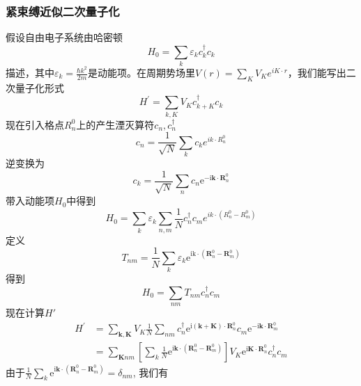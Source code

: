 \documentclass{article}
\numberwithin{equation}{subsection}
\begin{document}
\subsubsection*{紧束缚近似二次量子化}
假设自由电子系统由哈密顿
\begin{equation}
    H_{0}=\sum_{k} \varepsilon_{k} c_{k}^{\dagger} c_{k}
\end{equation}
描述，其中$\varepsilon_k=\frac{\hbar k^2}{2m}$是动能项。在周期势场里$V(r)=\sum_{K}V_{K}e^{iK\cdot r}$，我们能写出二次量子化形式
\begin{equation}
    H^{\prime}=\sum_{k, K} V_{K} c_{k+K}^{\dagger} c_{k}
\end{equation}
现在引入格点$R_n^0$上的产生湮灭算符$c_n,c_n^\dagger$
\begin{equation}
    c_n=\frac{1}{\sqrt{N}}\sum_{k}c_ke^{ik\cdot R_n^0}
\end{equation}
逆变换为
\begin{equation}
    c_{k}=\frac{1}{\sqrt{N}} \sum_{n} c_{n} \mathrm{e}^{-\mathrm{i} \mathbf{k} \cdot \mathbf{R}_{n}^{0}}
\end{equation}
带入动能项$H_0$中得到
\begin{equation}
    H_0=\sum_{k}\varepsilon_k\sum_{n,m}\frac{1}{N}c_n^\dagger c_m e^{ik\cdot(R_n^0-R_m^0)}
\end{equation}
定义
\begin{equation}
    T_{n m}=\frac{1}{N} \sum_{k} \varepsilon_{k} \mathrm{e}^{\mathrm{ik} \cdot\left(\mathbf{R}_{n}^{0}-\mathbf{R}_{m}^{0}\right)}
\end{equation}
得到
\begin{equation}
    H_{0}=\sum_{n m} T_{n m} c_{n}^{\dagger} c_{m}
\end{equation}
现在计算$H'$
\begin{equation}
    \begin{aligned}
        H^{\prime} &=\sum_{\mathbf{k}, \mathbf{K}} V_{K} \frac{1}{N} \sum_{n m} c_{n}^{\dagger} \mathrm{e}^{\mathrm{i}(\mathbf{k}+\mathbf{K}) \cdot \mathbf{R}_{n}^{0}} c_{m} \mathrm{e}^{-\mathrm{i} \mathbf{k} \cdot \mathbf{R}_{m}^{0}} \\
        &=\sum_{\mathbf{K} n m}\left[\sum_{k} \frac{1}{N} \mathrm{e}^{\mathrm{i} \mathbf{k} \cdot\left(\mathbf{R}_{n}^{0}-\mathbf{R}_{m}^{0}\right)}\right] V_{K} \mathrm{e}^{\mathrm{i} \mathbf{K} \cdot \mathbf{R}_{n}^{0}} c_{n}^{\dagger} c_{m}
        \end{aligned}
\end{equation}
由于$\frac{1}{N} \sum_{k} \mathrm{e}^{\mathrm{i} \mathbf{k} \cdot\left(\mathbf{R}_{n}^{0}-\mathbf{R}_{m}^{0}\right)}=\delta_{n m}$, 我们有
\end{document}
